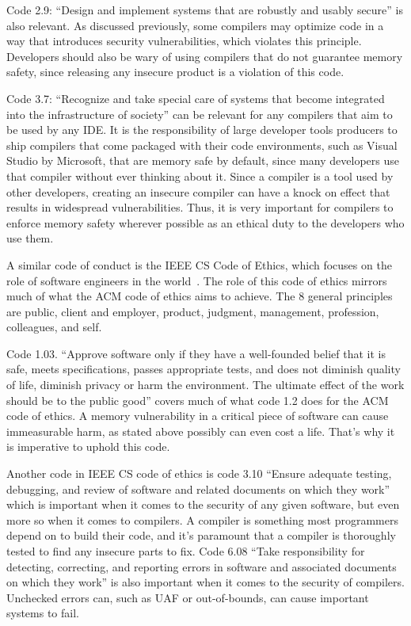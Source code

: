 \documentclass[sigconf, anonymous]{acmart}
\begin{document}
Code 2.9: “Design and implement systems that are robustly and usably secure” is also relevant. As discussed previously, some compilers may optimize code in a way that introduces security vulnerabilities, which violates this principle. Developers should also be wary of using compilers that do not guarantee memory safety, since releasing any insecure product is a violation of this code. 

Code 3.7: “Recognize and take special care of systems that become integrated into the infrastructure of society” can be relevant for any compilers that aim to be used by any IDE. It is the responsibility of large developer tools producers to ship compilers that come packaged with their code environments, such as Visual Studio by Microsoft, that are memory safe by default, since many developers use that compiler without ever thinking about it. Since a compiler is a tool used by other developers, creating an insecure compiler can have a knock on effect that results in widespread vulnerabilities. Thus, it is very important for compilers to enforce memory safety wherever possible as an ethical duty to the developers who use them.

A similar code of conduct is the IEEE CS Code of Ethics, which focuses on the role of software engineers in the world~\cite{IEEECODE}. The role of this code of ethics mirrors much of what the ACM code of ethics aims to achieve. The 8 general principles are public, client and employer, product, judgment, management, profession, colleagues, and self. 

Code 1.03. “Approve software only if they have a well-founded belief that it is safe, meets specifications, passes appropriate tests, and does not diminish quality of life, diminish privacy or harm the environment. The ultimate effect of the work should be to the public good” covers much of what code 1.2 does for the ACM code of ethics. A memory vulnerability in a critical piece of software can cause immeasurable harm, as stated above possibly can even cost a life. That’s why it is imperative to uphold this code. 

Another code in IEEE CS code of ethics is code 3.10 “Ensure adequate testing, debugging, and review of software and related documents on which they work” which is important when it comes to the security of any given software, but even more so when it comes to compilers. A compiler is something most programmers depend on to build their code, and it's paramount that a compiler is thoroughly tested to find any insecure parts to fix. Code 6.08 “Take responsibility for detecting, correcting, and reporting errors in software and associated documents on which they work” is also important when it comes to the security of compilers. Unchecked errors can, such as UAF or out-of-bounds, can cause important systems to fail.
\end{document}
